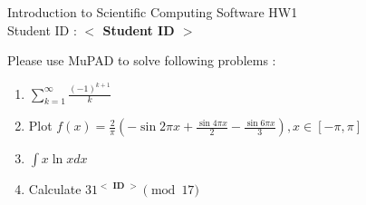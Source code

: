 \documentclass[12pt,a4paper]{article}
\newcommand{\placeholder}[1]{\textbf{$<$ #1 $>$}}
\newcommand{\idnumber}{\placeholder{Student ID}}
\newcommand{\moodleid}{\placeholder{ID}}
\begin{document}
\begin{flushleft}Introduction to Scientific Computing Software HW1
\\Student ID : \idnumber{}\end{flushleft}

Please use MuPAD to solve following problems : 
\begin{enumerate}
\item 
$\displaystyle{\sum^\infty_{k=1}\frac{(-1)^{k+1}}{k}}$

\item Plot
$\displaystyle{f(x)=\frac{2}{\pi}\left(-\sin 2\pi x+\frac{\sin 4\pi x}{2}-\frac{\sin 6\pi x}{3}\right)},x\in[-\pi,\pi]$

\item $\displaystyle{\int x\ln x dx}$

\item Calculate $31^{\moodleid}\pmod{17}$

\end{enumerate}
\end{document}
